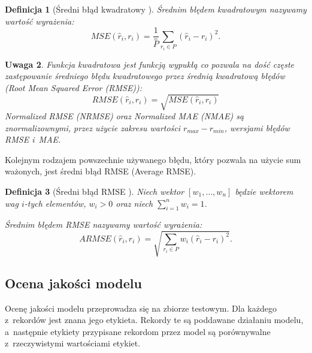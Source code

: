 \documentclass[12pt,a4paper]{report}
\newtheorem{df}{Definicja}[chapter]
\newtheorem{uwaga}[df]{Uwaga}
\begin{document}
\begin{df}[Średni błąd kwadratowy  {\citep[Sec 4.1.1]{rsh}}]
Średnim błędem kwadratowym nazywamy wartość wyrażenia:
$$
\mathit{MSE}(\widehat{r}_i,r_i) = \frac{1}{\stackrel{=}{\mathit{P}}}\sum_{r_i \in \mathit{P}}(\widehat{r}_i-r_i)^2.
$$
\end{df}
\begin{uwaga}{\citep[Sec 4.1.1]{rsh}}
Funkcja kwadratowa jest funkcją wypukłą co pozwala na dość częste zastępowanie średniego błędu kwadratowego przez średnią kwadratową błędów (Root Mean Squared Error (RMSE)):
$$
\mathit{RMSE}(\widehat{r}_i,r_i) = \sqrt{\mathit{MSE}(\widehat{r}_i,r_i)}
$$
Normalized RMSE (NRMSE) oraz Normalized MAE (NMAE) są znormalizownymi, przez użycie zakresu wartości $r_{max} - r_{min}$, wersjami błędów RMSE i~MAE.
\end{uwaga}
Kolejnym rodzajem powszechnie używanego błędu, który pozwala na użycie sum ważonych, jest średni błąd RMSE (Average RMSE).

\begin{df}[Średni błąd RMSE {\citep[Sec 4.1.1]{rsh}}]
Niech wektor $[w_1, \ldots, w_n]$ będzie wektorem wag $i$-tych elementów, $w_i>0$ oraz niech $\sum_{i=1}^n w_i = 1$.

Średnim błędem RMSE nazywamy wartość wyrażenia:
$$
\mathit{ARMSE}(\widehat{r}_i,r_i) = \sqrt{\sum_{r_i\in \mathit{P}}w_{i}(\widehat{r}_i-r_i)^2}.
$$
\end{df}
\subsection{Ocena jakości modelu}
Ocenę jakości modelu przeprowadza się na zbiorze testowym. Dla każdego z~rekordów jest znana jego etykieta. Rekordy te są poddawane działaniu modelu, a~następnie etykiety przypisane rekordom przez model są porównywalne z~rzeczywistymi wartościami etykiet.
\end{document}
